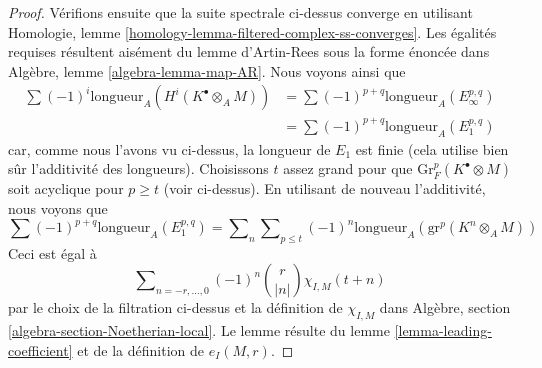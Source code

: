 \begin{proof}
\medskip\noindent
Vérifions ensuite que la suite spectrale ci-dessus converge
en utilisant Homologie, lemme \ref{homology-lemma-filtered-complex-ss-converges}.
Les égalités requises résultent aisément du lemme d'Artin-Rees
sous la forme énoncée dans Algèbre, lemme \ref{algebra-lemma-map-AR}.
Nous voyons ainsi que
\begin{align*}
\sum (-1)^i\text{longueur}_A(H^i(K^\bullet \otimes_A M))
& =
\sum (-1)^{p + q} \text{longueur}_A(E_\infty^{p, q}) \\
& =
\sum (-1)^{p + q} \text{longueur}_A(E_1^{p, q})
\end{align*}
car, comme nous l'avons vu ci-dessus, la longueur de $E_1$ est finie
(cela utilise bien sûr l'additivité des longueurs). Choisissons $t$ assez
grand pour que $\text{Gr}^p_F(K^\bullet \otimes M)$
soit acyclique pour $p \geq t$ (voir ci-dessus). En utilisant
de nouveau l'additivité, nous voyons que
$$
\sum (-1)^{p + q} \text{longueur}_A(E_1^{p, q}) =
\sum\nolimits_n \sum\nolimits_{p \leq t}
(-1)^n \text{longueur}_A(\text{gr}^p(K^n \otimes_A M))
$$
Ceci est égal à
$$
\sum\nolimits_{n = -r, \ldots, 0} (-1)^n{r \choose |n|} \chi_{I, M}(t + n)
$$
par le choix de la filtration ci-dessus et la définition de $\chi_{I, M}$ dans
Algèbre, section \ref{algebra-section-Noetherian-local}.
Le lemme résulte du lemme \ref{lemma-leading-coefficient}
et de la définition de $e_I(M, r)$.
\end{proof}

